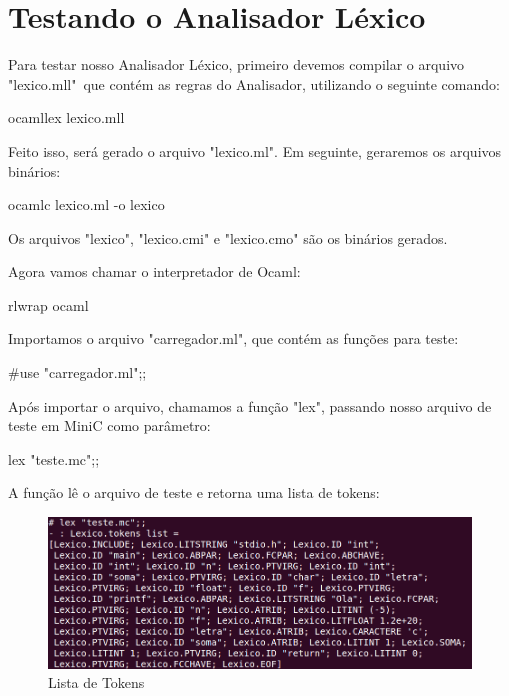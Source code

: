 \documentclass[12pt,a4paper,twoside]{report}
\begin{document}
\section{Testando o Analisador Léxico}

Para testar nosso Analisador Léxico, primeiro devemos compilar o arquivo "lexico.mll"\ que contém as regras do Analisador, utilizando o seguinte comando:

\begin{terminal}
ocamllex lexico.mll
\end{terminal}

Feito isso, será gerado o arquivo "lexico.ml". Em seguinte, geraremos os arquivos binários:

\begin{terminal}
ocamlc lexico.ml -o lexico
\end{terminal}

Os arquivos "lexico", "lexico.cmi" e "lexico.cmo" são os binários gerados. 

Agora vamos chamar o interpretador de Ocaml:

\begin{terminal}
rlwrap ocaml
\end{terminal}

Importamos o arquivo "carregador.ml", que contém as funções para teste:

\begin{terminal}
#use "carregador.ml";;
\end{terminal}



Após importar o arquivo, chamamos a função "lex", passando nosso arquivo de teste em MiniC como parâmetro:

\begin{terminal}
lex "teste.mc";;
\end{terminal}



A função lê o arquivo de teste e retorna uma lista de tokens:

\begin{figure}[!h]
\centering
\caption{Lista de Tokens} \label{fig:lexteste}
\includegraphics[scale=0.45]{imagens/lextestemc.png}
\end{figure}
\end{document}

